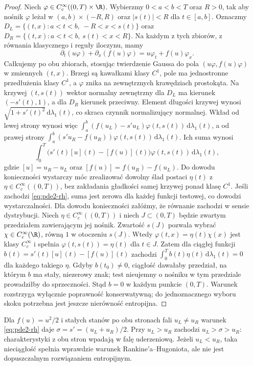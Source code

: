 \begin{proof}
Niech $\varphi\in C_c^\infty((0,T)\times\R)$.
Wybierzmy $0<a<b<T$ oraz $R>0$, tak aby nośnik
$\varphi$ leżał w $(a,b)\times(-R,R)$ oraz
$|s(t)|<R$ dla $t\in[a,b]$. Oznaczmy
$D_L=\{(t,x):a<t<b,\ -R<x<s(t)\}$ oraz
$D_R=\{(t,x):a<t<b,\ s(t)<x<R\}$.
Na każdym z tych zbiorów, z równania klasycznego
i reguły iloczynu, mamy
\[
 \partial_t(u\varphi)+\partial_x(f(u)\varphi)
 =u\varphi_t+f(u)\varphi_x.
\]
Całkujemy po obu zbiorach, stosując twierdzenie Gaussa
do pola $(u\varphi,f(u)\varphi)$ w zmiennych $(t,x)$.
Brzegi są kawałkami klasy $C^1$, pole ma jednostronne
przedłużenia klasy $C^1$, a $\varphi$ znika na zewnętrznych
krawędziach prostokąta. Na krzywej $(t,s(t))$
wektor normalny zewnętrzny dla $D_L$ ma kierunek
$(-s'(t),1)$, a dla $D_R$ kierunek przeciwny.
Element długości krzywej wynosi
$\sqrt{1+s'(t)^2}\,\mathrm d\lambda_1(t)$,
co skraca czynnik normalizujący normalnej.
Wkład od lewej strony wynosi więc
$\int_a^b(f(u_L)-s'u_L)\varphi(t,s(t))\,\mathrm d\lambda_1(t)$,
a od prawej strony
$\int_a^b(s'u_R-f(u_R))\varphi(t,s(t))\,\mathrm d\lambda_1(t)$.
Ich suma wynosi
\[
 \int_0^T\bigl(s'(t)[u](t)-[f(u)](t)\bigr)
 \varphi(t,s(t))\,\mathrm d\lambda_1(t),
\]
gdzie $[u]=u_R-u_L$ oraz $[f(u)]=f(u_R)-f(u_L)$.
Do dowodu konieczności wystarczy móc zrealizować
dowolny ślad postaci $\eta(t)$ z
$\eta\in C_c^\infty((0,T))$, bez zakładania
gładkości samej krzywej ponad klasę $C^1$.
Jeśli zachodzi \eqref{eq:pde2-rh}, suma jest zerowa
dla każdej funkcji testowej, co dowodzi wystarczalności.
Dla dowodu konieczności załóżmy, że równanie zachodzi
w sensie dystrybucji. Niech $\eta\in C_c^\infty((0,T))$
i niech $J\subset(0,T)$ będzie zwartym przedziałem
zawierającym jej nośnik. Zwartość $s(J)$
pozwala wybrać $\chi\in C_c^\infty(\R)$, równą $1$
w otoczeniu $s(J)$. Wtedy
$\varphi(t,x)=\eta(t)\chi(x)$ jest klasy $C_c^\infty$
i spełnia $\varphi(t,s(t))=\eta(t)$ dla $t\in J$.
Zatem dla ciągłej funkcji
$b(t)=s'(t)[u](t)-[f(u)](t)$ zachodzi
$\int_0^T b(t)\eta(t)\,\mathrm d\lambda_1(t)=0$ dla każdego takiego $\eta$.
Gdyby $b(t_0)\ne0$, ciągłość dawałaby przedział, na którym
$b$ ma stały, niezerowy znak; test nieujemny o nośniku w tym
przedziale prowadziłby do sprzeczności. Stąd $b=0$
w każdym punkcie $(0,T)$.
Warunek rozstrzyga wyłącznie poprawność konserwatywną;
do jednoznacznego wyboru skoku potrzebna jest jeszcze
nierówność entropijna.
\end{proof}

\begin{przyklad}
Dla $f(u)=u^2/2$ i stałych stanów po obu stronach
fali $u_L\ne u_R$ warunek \eqref{eq:pde2-rh} daje
$\sigma=s'=(u_L+u_R)/2$.
Przy $u_L>u_R$ zachodzi $u_L>\sigma>u_R$:
charakterystyki z obu stron wpadają w falę uderzeniową.
Jeżeli $u_L<u_R$, taka nieciągłość spełnia wprawdzie
warunek Rankine'a--Hugoniota, ale nie jest dopuszczalnym
rozwiązaniem entropijnym.
\end{przyklad}

